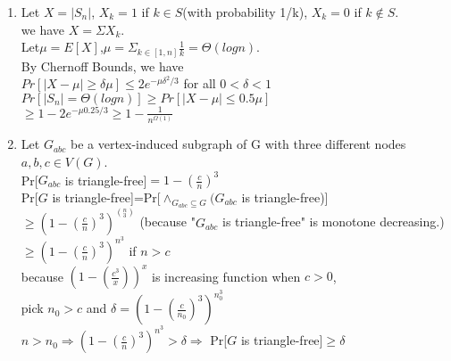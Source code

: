 \documentclass[11pt]{article}
\begin{document}
\begin{enumerate}
\item 
Let $X=|S_n|$, $X_k=1$ if $k\in S$(with probability 1/k), $X_k=0$ if $k\notin S$.\\
we have $X=\Sigma X_k$.\\
Let$\mu=E[X]$,$\mu=\Sigma_{k\in [1,n]}\frac{1}{k}=\Theta(logn)$.\\ 
By Chernoff Bounds, we have\\
$Pr[|X-\mu|\geq\delta\mu]\leq 2e^{-\mu\delta^2/3}$ for all $0<\delta<1$\\
$Pr[|S_n|=\Theta(logn)]\geq Pr[|X-\mu|\leq0.5\mu]$\\
$\geq 1-2e^{-\mu 0.25/3}     \geq 1-\frac{1}{n^{\Omega(1)}}$


\item 
Let $G_{abc}$ be a vertex-induced subgraph of G with three different nodes $a,b,c\in V(G)$.\\
Pr[$G_{abc}$ is triangle-free]$=1-(\frac{c}{n})^3$\\
Pr[$G$ is triangle-free]=Pr[$\wedge_{G_{abc}\subseteq G} (G_{abc}$ is triangle-free)]\\
$\geq(1-(\frac{c}{n})^3)^{(^{n}_{3})}$ (because "$G_{abc}$ is triangle-free" is monotone decreasing.)\\
$\geq(1-(\frac{c}{n})^3)^{n^3}$ if $n>c$\\
because $(1-(\frac{c^3}{x}))^{x}$ is increasing function when $c>0$,\\
pick $n_0>c$ and $\delta=(1-(\frac{c}{n_0})^3)^{n_0^3}$\\
$n>n_0\Rightarrow  (1-(\frac{c}{n})^3)^{n^3}>\delta \Rightarrow$ Pr[$G$ is triangle-free]$\geq\delta$\\







\end{enumerate}
\end{document}
